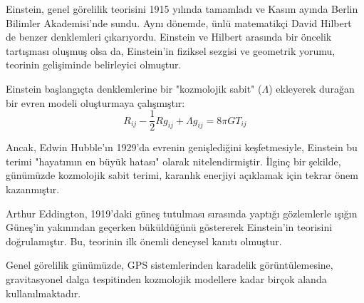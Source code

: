 \documentclass[11pt,letterpaper,twocolumn]{fenbil}
\begin{document}
Einstein, genel görelilik teorisini 1915 yılında tamamladı ve Kasım ayında Berlin Bilimler Akademisi'nde sundu. Aynı dönemde, ünlü matematikçi David Hilbert de benzer denklemleri çıkarıyordu. Einstein ve Hilbert arasında bir öncelik tartışması oluşmuş olsa da, Einstein'in fiziksel sezgisi ve geometrik yorumu, teorinin gelişiminde belirleyici olmuştur.

Einstein başlangıçta denklemlerine bir "kozmolojik sabit" ($\Lambda$) ekleyerek durağan bir evren modeli oluşturmaya çalışmıştır:
\begin{equation}
R_{ij} - \frac{1}{2}Rg_{ij} + \Lambda g_{ij} = 8\pi G T_{ij}
\end{equation}

Ancak, Edwin Hubble'ın 1929'da evrenin genişlediğini keşfetmesiyle, Einstein bu terimi "hayatımın en büyük hatası" olarak nitelendirmiştir. İlginç bir şekilde, günümüzde kozmolojik sabit terimi, karanlık enerjiyi açıklamak için tekrar önem kazanmıştır.

Arthur Eddington, 1919'daki güneş tutulması sırasında yaptığı gözlemlerle ışığın Güneş'in yakınından geçerken büküldüğünü göstererek Einstein'in teorisini doğrulamıştır. Bu, teorinin ilk önemli deneysel kanıtı olmuştur.

Genel görelilik günümüzde, GPS sistemlerinden karadelik görüntülemesine, gravitasyonel dalga tespitinden kozmolojik modellere kadar birçok alanda kullanılmaktadır.
\end{document}
